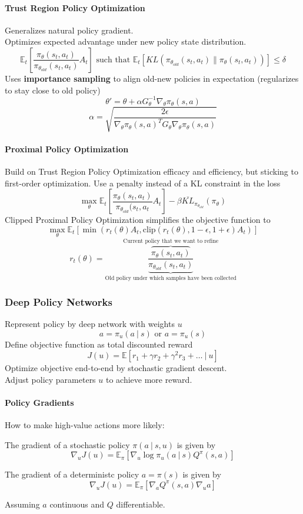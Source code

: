 \documentclass[10pt]{report}
\begin{document}
\paragraph{Trust Region Policy Optimization} Generalizes natural policy gradient.\\
Optimizes expected advantage under new policy state distribution.
$$\mathbb{E}_t\left[\frac{\pi_\theta(s_t,a_t)}{\pi_{\theta_{old}}(s_t,a_t)}A_t\right]\text{ such that }\mathbb{E}_t\left[KL\left(\pi_{\theta_{old}}(s_t,a_t)\|\pi_\theta(s_t,a_t)\right)\right]\leq \delta$$
Uses \textbf{importance sampling} to align old-new policies in expectation (regularizes to stay close to old policy)
$$\theta'=\theta+\alpha G_\theta^{-1}\nabla_\theta\pi_\theta(s,a)$$
$$\alpha=\sqrt{\frac{2\epsilon}{\nabla_\theta\pi_\theta(s,a)^TG_\theta\nabla_\theta\pi_\theta(s,a)}}$$
\paragraph{Proximal Policy Optimization} Build on Trust Region Policy Optimization efficacy and efficiency, but sticking to first-order optimization. Use a penalty instead of a KL constraint in the loss
$$\max_\theta \mathbb{E}_t\left[\frac{\pi_\theta(s_t,a_t)}{\pi_{\theta_{old}}(s_t,a_t}A_t\right]-\beta\overline{KL}_{\pi_{\theta_{old}}}(\pi_\theta)$$
Clipped Proximal Policy Optimization simplifies the objective function to
$$\max_\theta \mathbb{E}_t[\min(r_t(\theta)A_t, \text{clip}(r_t(\theta),1-\epsilon,1+\epsilon)A_t)]$$
$$r_t(\theta)=\underset{\text{Old policy under which samples have been collected}}{\overset{\text{Current policy that we want to refine}}{\frac{\overbrace{\pi_\theta(s_t,a_t)}}{\underbrace{\pi_{\theta_{old}}(s_t,a_t)}}}}$$
\subsubsection{Deep Policy Networks}
Represent policy by deep network with weights $u$
$$a=\pi_u(a\:|\:s)\text{ or } a=\pi_u(s)$$
Define objective function as total discounted reward
$$J(u) = \mathbb{E}[r_1+\gamma r_2+\gamma^2r_3+\ldots\:|\:u]$$
Optimize objective end-to-end by stochastic gradient descent.\\
Adjust policy parameters $u$ to achieve more reward.
\paragraph{Policy Gradients} How to make high-value actions more likely:
\begin{list}{}{}
	\item The gradient of a stochastic policy $\pi(a\:|\:s,u)$ is given by $$\nabla_u J(u) = \mathbb{E}_\pi[\nabla_u\log\pi_u(a\:|\:s)Q^\pi(s,a)]$$
	\item The gradient of a deterministc policy $a=\pi(s)$ is given by
	$$\nabla_u J(u) = \mathbb{E}_\pi[\nabla_aQ^\pi(s,a)\nabla_u a]$$
\end{list}
Assuming $a$ continuous and $Q$ differentiable.
\end{document}
